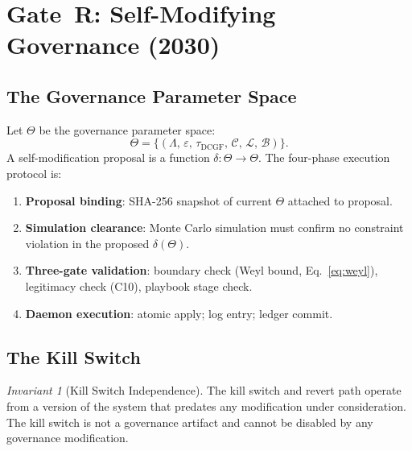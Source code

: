 \documentclass[11pt,letterpaper]{article}
\theoremstyle{remark}
\newtheorem{invariant}[theorem]{Invariant}
\begin{document}
\section{Gate~R: Self-Modifying Governance (2030)}

\subsection{The Governance Parameter Space}

Let $\Theta$ be the governance parameter space:
\[
  \Theta = \bigl\{ (\Lambda,\, \varepsilon,\, \tau_{\text{DCGF}},\,
  \mathcal{C},\, \mathcal{L},\, \mathcal{B}) \bigr\}.
\]
A self-modification proposal is a function $\delta : \Theta \to \Theta$.
The four-phase execution protocol is:

\begin{enumerate}[leftmargin=2em]
  \item \textbf{Proposal binding}: SHA-256 snapshot of current $\Theta$
    attached to proposal.
  \item \textbf{Simulation clearance}: Monte Carlo simulation must confirm
    no constraint violation in the proposed $\delta(\Theta)$.
  \item \textbf{Three-gate validation}: boundary check (Weyl bound,
    Eq.~\ref{eq:weyl}), legitimacy check (C10), playbook stage check.
  \item \textbf{Daemon execution}: atomic apply; log entry; ledger commit.
\end{enumerate}

\subsection{The Kill Switch}

\begin{invariant}[Kill Switch Independence]
The kill switch and revert path operate from a version of the system
that predates any modification under consideration.
The kill switch is not a governance artifact and cannot be disabled
by any governance modification.
\end{invariant}
\end{document}
